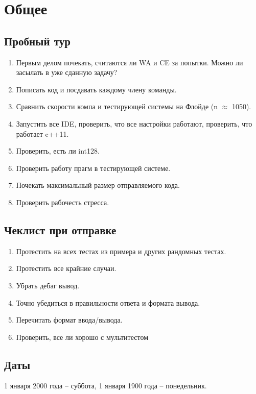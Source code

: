 \documentclass[14pt,fleqn]{article}
\begin{document}
	\tableofcontents
	\pagebreak
	\section{Общее}
	
	\subsection{Пробный тур}
	\begin{enumerate}[topsep=0pt,itemsep=-1ex,partopsep=1ex,parsep=1ex]
		\item Первым делом почекать, считаются ли WA и CE за попытки. Можно ли засылать в уже сданную задачу?
		\item Пописать код и посдавать каждому члену команды.
		\item Сравнить скорости компа и тестирующей системы на Флойде (n $\approx$ 1050).
		\item Запустить все IDE, проверить, что все настройки работают, проверить, что работает c++11.
		\item Проверить, есть ли int128.
		\item Проверить работу прагм в тестирующей системе.
		\item Почекать максимальный размер отправляемого кода.
		\item Проверить рабочесть стресса.
	\end{enumerate}
	\subsection{Чеклист при отправке}
	\begin{enumerate}[topsep=0pt,itemsep=-1ex,partopsep=1ex,parsep=1ex]
		\item Протестить на всех тестах из примера и других рандомных тестах.
		\item Протестить все крайние случаи.
		\item Убрать дебаг вывод.
		\item Точно убедиться в правильности ответа и формата вывода.
		\item Перечитать формат ввода/вывода.
		\item Проверить, все ли хорошо с мультитестом
	\end{enumerate}
	\subsection{Даты}
	1 января 2000 года – суббота, 1 января 1900 года – понедельник.
\end{document}
